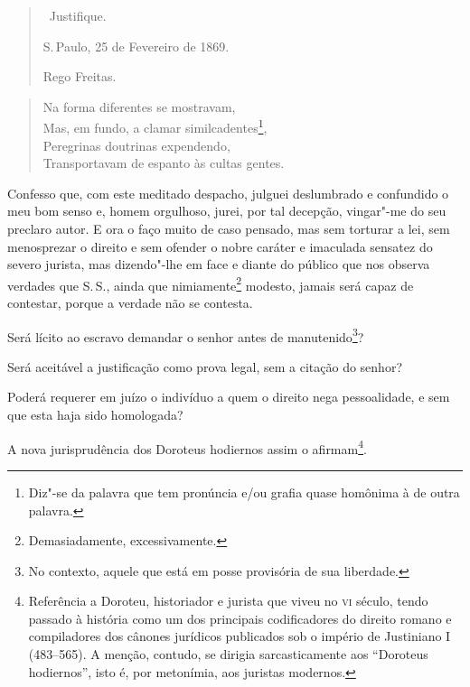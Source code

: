 \begin{quote}
\forceindent\ Justifique.

S.\,Paulo, 25 de Fevereiro de 1869.

Rego Freitas.
\end{quote}


\begin{verse}
Na forma diferentes se mostravam,\\
Mas, em fundo, a clamar similcadentes\footnote{Diz"-se da palavra que
  tem pronúncia e/ou grafia quase homônima à de outra palavra.},\\
Peregrinas doutrinas expendendo,\\
Transportavam de espanto às cultas gentes.
\end{verse}

Confesso que, com este meditado despacho, julguei deslumbrado e
confundido o meu bom senso e, homem orgulhoso, jurei, por tal decepção,
vingar"-me do seu preclaro autor. E ora o faço muito de caso pensado, mas
sem torturar a lei, sem menosprezar o direito e sem ofender o nobre
caráter e imaculada sensatez do severo jurista, mas dizendo"-lhe em face
e diante do público que nos observa verdades que S.\,S., ainda que
nimiamente\footnote{Demasiadamente, excessivamente.} modesto, jamais
será capaz de contestar, porque a verdade não se contesta.

Será lícito ao escravo demandar o senhor antes de manutenido\footnote{
  No contexto, aquele que está em posse provisória de sua liberdade.}?

Será aceitável a justificação como prova legal, sem a citação do senhor?

Poderá requerer em juízo o indivíduo a quem o direito nega pessoalidade,
e sem que esta haja sido homologada?

A nova jurisprudência dos Doroteus hodiernos assim o afirmam\footnote{
  Referência a Doroteu, historiador e jurista que viveu no \textsc{vi} século,
  tendo passado à história como um dos principais codificadores do
  direito romano e compiladores dos cânones jurídicos publicados sob o
  império de Justiniano I (483--565). A menção, contudo, se dirigia
  sarcasticamente aos ``Doroteus hodiernos'', isto é, por metonímia, aos
  juristas modernos.}.

